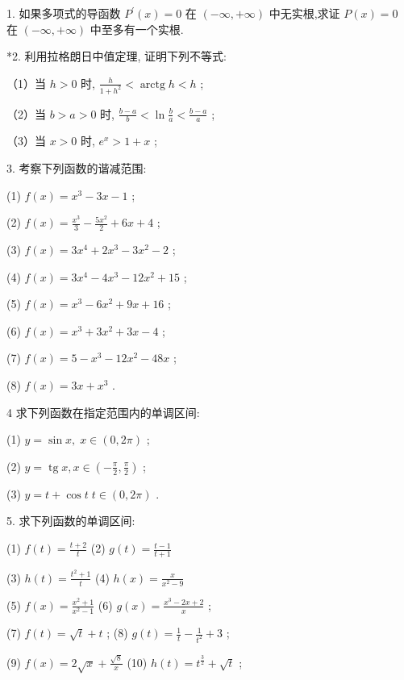 \documentclass[lang=cn,newtx,10pt,scheme=chinese]{elegantbook}
\begin{document}
1. 如果多项式的导函数 \({P}^{\prime }\left( x\right) = 0\) 在 \(\left( {-\infty , + \infty }\right)\) 中无实根,求证 \(P\left( x\right) = 0\) 在 \(\left( {-\infty , + \infty }\right)\) 中至多有一个实根.

*2. 利用拉格朗日中值定理, 证明下列不等式:

（1）当 \(h > 0\) 时, \(\frac{h}{1 + {h}^{2}} < \operatorname{arctg}h < h\) ;

（2）当 \(b > a > 0\) 时, \(\frac{b - a}{b} < \ln \frac{b}{a} < \frac{b - a}{a}\) ;

（3）当 \(x > 0\) 时, \({e}^{x} > 1 + x\) ;

3. 考察下列函数的谐减范围:

(1) \(f\left( x\right) = {x}^{3} - {3x} - 1\) ;

(2) \(f\left( x\right) = \frac{{x}^{3}}{3} - \frac{5{x}^{2}}{2} + {6x} + 4\) ;

(3) \(f\left( x\right) = 3{x}^{4} + 2{x}^{3} - 3{x}^{2} - 2\) ;

(4) \(f\left( x\right) = 3{x}^{4} - 4{x}^{3} - {12}{x}^{2} + {15}\) ;

(5) \(f\left( x\right) = {x}^{3} - 6{x}^{2} + {9x} + {16}\) ;

(6) \(f\left( x\right) = {x}^{3} + 3{x}^{2} + {3x} - 4\) ;

(7) \(f\left( x\right) = 5 - {x}^{3} - {12}{x}^{2} - {48x}\) ;

(8) \(f\left( x\right) = {3x} + {x}^{3}\) .

4 求下列函数在指定范围内的单调区间:

(1) \(y = \sin x,\;x \in \left( {0,{2\pi }}\right)\) ;

(2) \(y = \operatorname{tg}x,x \in \left( {-\frac{\pi }{2},\frac{\pi }{2}}\right)\) ;

(3) \(y = t + \cos t\;t \in \left( {0,{2\pi }}\right)\) .

5. 求下列函数的单调区间:

(1) \(f\left( t\right) = \frac{t + 2}{t}\) (2) \(g\left( t\right) = \frac{t - 1}{t + 1}\)

(3) \(h\left( t\right) = \frac{{t}^{2} + 1}{t}\) (4) \(h\left( x\right) = \frac{x}{{x}^{2} - 9}\)

(5) \(f\left( x\right) = \frac{{x}^{2} + 1}{{x}^{2} - 1}\) (6) \(g\left( x\right) = \frac{{x}^{3} - {2x} + 2}{x}\) ;

(7) \(f\left( t\right) = \sqrt{t} + t\) ; (8) \(g\left( t\right) = \frac{1}{t} - \frac{1}{{t}^{2}} + 3\) ;

(9) \(f\left( x\right) = 2\sqrt{x} + \frac{\sqrt{8}}{x}\) (10) \(h\left( t\right) = {t}^{\frac{3}{2}} + \sqrt{t}\) ;
\end{document}
